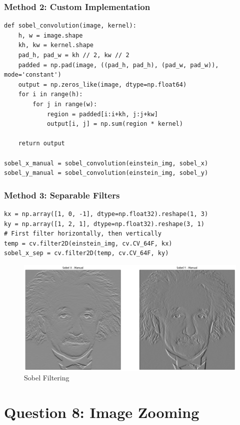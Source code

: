 \documentclass[11pt]{article}
\begin{document}
\subsubsection*{Method 2: Custom Implementation}
\begin{lstlisting}[style=pythonstyle]
def sobel_convolution(image, kernel):
    h, w = image.shape
    kh, kw = kernel.shape
    pad_h, pad_w = kh // 2, kw // 2
    padded = np.pad(image, ((pad_h, pad_h), (pad_w, pad_w)), mode='constant')
    output = np.zeros_like(image, dtype=np.float64)
    for i in range(h):
        for j in range(w):
            region = padded[i:i+kh, j:j+kw]
            output[i, j] = np.sum(region * kernel)
    
    return output

sobel_x_manual = sobel_convolution(einstein_img, sobel_x)
sobel_y_manual = sobel_convolution(einstein_img, sobel_y)
\end{lstlisting}

\subsubsection*{Method 3: Separable Filters}
\begin{lstlisting}[style=pythonstyle]
kx = np.array([1, 0, -1], dtype=np.float32).reshape(1, 3)
ky = np.array([1, 2, 1], dtype=np.float32).reshape(3, 1)
# First filter horizontally, then vertically
temp = cv.filter2D(einstein_img, cv.CV_64F, kx)
sobel_x_sep = cv.filter2D(temp, cv.CV_64F, ky)

\end{lstlisting}

\begin{figure}[H]
    \centering
    \includegraphics[width=0.65\linewidth]{resources/sobel_manual.png}
    \caption{Sobel Filtering}
    \label{fig:placeholder}
\end{figure}

\section*{Question 8: Image Zooming}
\end{document}
